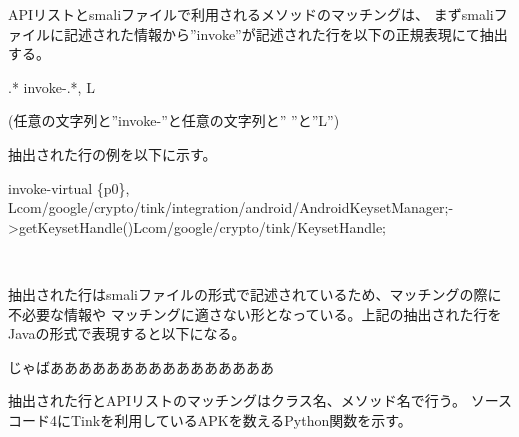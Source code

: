APIリストとsmaliファイルで利用されるメソッドのマッチングは、
まずsmaliファイルに記述された情報から”invoke”が記述された行を以下の正規表現にて抽出する。

\begin{center} .* invoke-.*, L \end{center}
(任意の文字列と''invoke-''と任意の文字列と'' ''と''L'')

抽出された行の例を以下に示す。

\begin{center} invoke-virtual \{p0\}, Lcom/google/crypto/tink/integration/android/AndroidKeysetManager;-\textgreater getKeysetHandle()Lcom/google/crypto/tink/KeysetHandle;\end{center}　

抽出された行はsmaliファイルの形式で記述されているため、マッチングの際に不必要な情報や
マッチングに適さない形となっている。上記の抽出された行をJavaの形式で表現すると以下になる。

\begin{center}じゃばああああああああああああああああ\end{center}
\fi
抽出された行とAPIリストのマッチングはクラス名、メソッド名で行う。
ソースコード4にTinkを利用しているAPKを数えるPython関数を示す。%




































